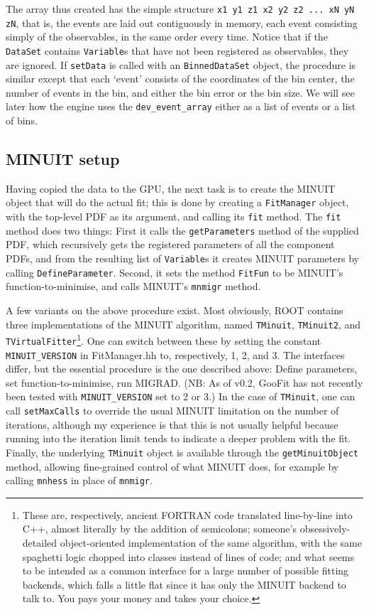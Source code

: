 \documentclass[12pt,pdflatex]{article}
\begin{document}
The array thus created has the simple structure \verb|x1 y1 z1 x2 y2 z2 ... xN yN zN|,
that is, the events are laid out contiguously in memory, each event consisting simply
of the observables, in the same order every time. Notice that if the \texttt{DataSet} contains \texttt{Variable}s
that have not been registered as observables, they are ignored. 
If \texttt{setData}
is called with an \texttt{BinnedDataSet} object, the procedure is similar
except that each `event' consists of the coordinates of the bin center, the
number of events in the bin, and either the bin error or the bin size. We will
see later how the engine uses the \texttt{dev\_event\_array} either as a list
of events or a list of bins. 

\subsection{MINUIT setup} 

Having copied the data to the GPU, the next task is to create the MINUIT object
that will do the actual fit; this is done by creating a \texttt{FitManager} object,
with the top-level PDF as its argument, and calling its \texttt{fit} method. 
The \texttt{fit} method does two things: First it calls the \texttt{getParameters}
method of the supplied PDF, which recursively gets the registered parameters of
all the component PDFs, and from the resulting list of \texttt{Variable}s it creates
MINUIT parameters by calling \texttt{DefineParameter}. Second, it sets the method
\texttt{FitFun} to be MINUIT's function-to-minimise, and calls MINUIT's \texttt{mnmigr}
method. 

A few variants on the above procedure exist. Most obviously, ROOT contains three 
implementations of the MINUIT algorithm, named \texttt{TMinuit}, \texttt{TMinuit2}, 
and \texttt{TVirtualFitter}\footnote{These are, respectively, ancient FORTRAN code
translated line-by-line into C++, almost literally by the addition of semicolons; 
someone's obsessively-detailed object-oriented
implementation of the same algorithm, with the same spaghetti logic chopped into
classes instead of lines of code; and what seems to be intended as a common interface
for a large number of possible fitting backends, which falls a little flat since it
has only the MINUIT backend to talk to. You pays your money and takes your choice.}. 
One can switch between these by setting the constant 
\texttt{MINUIT\_VERSION} in FitManager.hh to, respectively, 1, 2, and 3. The interfaces differ,
but the essential procedure is the one described above: Define parameters, set
function-to-minimise, run MIGRAD. (NB: As of v0.2, GooFit has not recently been
tested with \texttt{MINUIT\_VERSION} set to 2 or 3.) In the case of \texttt{TMinuit},
one can call \texttt{setMaxCalls} to override the usual MINUIT limitation on the
number of iterations, although my experience is that this is not usually helpful
because running into the iteration limit tends to indicate a deeper problem with
the fit. Finally, the underlying \texttt{TMinuit} object is available through the
\texttt{getMinuitObject} method, allowing fine-grained control of what MINUIT does, 
for example by calling \texttt{mnhess} in place of \texttt{mnmigr}.
\end{document}
